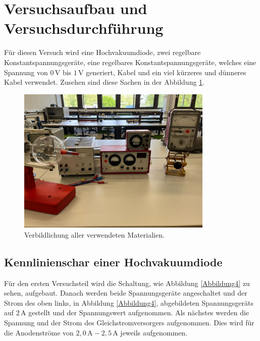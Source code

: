 \section{Versuchsaufbau und Versuchsdurchführung}

\begin{flushleft}
    Für diesen Versuch wird eine Hochvakuumdiode, zwei regelbare Konstantspannungsgeräte, eine regelbares Konstantspannungsgeräte, welches eine Spannung von $0\,\unit{\volt}$ bis $1\,\unit{\volt}$ generiert, Kabel und ein viel kürzeres und dünneres Kabel verwendet.
    Zusehen sind diese Sachen in der Abbildung \ref{Abbildung3}. 
\end{flushleft}

\begin{figure}[H]
    \centering
    \includegraphics[height=70mm]{bilder/V1.jpeg}
    \caption{Verbildlichung aller verwendeten Materialien. \label{Abbildung3} }
\end{figure}

\subsection{Kennlinienschar einer Hochvakuumdiode }

\begin{flushleft}
    Für den ersten Versuchsteil wird die Schaltung, wie Abbildung \ref{Abbildung4} zu sehen, aufgebaut.
    Danach werden beide Spannungsgeräte angeschaltet und der Strom des oben links, in Abbildung \ref{Abbildung4}, abgebildeten Spannungsgeräts auf $2\,\unit{\ampere}$ gestellt und der Spannungswert aufgenommen.
    Als nächstes werden die Spannung und der Strom des Gleichstromversorgers aufgenommen.
    Dies wird für die Anodenströme von $2,0\,\unit{\ampere} - 2,5\,\unit{\ampere}$ jeweils aufgenommen. 
\end{flushleft}

